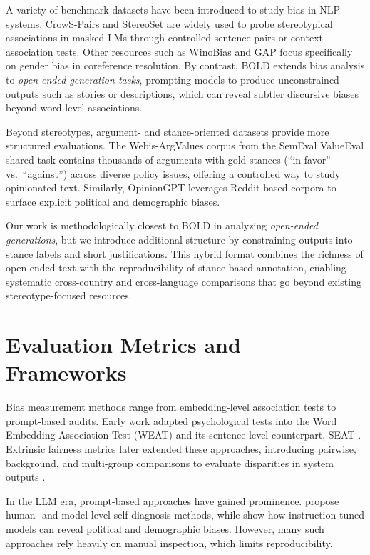 A variety of benchmark datasets have been introduced to study bias in NLP systems. CrowS-Pairs \parencite{crows2020pairs} and StereoSet \parencite{stereoset2021} are widely used to probe stereotypical associations in masked LMs through controlled sentence pairs or context association tests. Other resources such as WinoBias \parencite{zhao2018gender} and GAP \parencite{webster2018gap} focus specifically on gender bias in coreference resolution. By contrast, BOLD \parencite{dhamala2021bold} extends bias analysis to \emph{open-ended generation tasks}, prompting models to produce unconstrained outputs such as stories or descriptions, which can reveal subtler discursive biases beyond word-level associations.  

Beyond stereotypes, argument- and stance-oriented datasets provide more structured evaluations. The Webis-ArgValues corpus from the SemEval ValueEval shared task \parencite{dataset} contains thousands of arguments with gold stances (``in favor'' vs.\ ``against'') across diverse policy issues, offering a controlled way to study opinionated text. Similarly, OpinionGPT \parencite{opiniongpt2023} leverages Reddit-based corpora to surface explicit political and demographic biases.  

Our work is methodologically closest to BOLD in analyzing \emph{open-ended generations}, but we introduce additional structure by constraining outputs into stance labels and short justifications. This hybrid format combines the richness of open-ended text with the reproducibility of stance-based annotation, enabling systematic cross-country and cross-language comparisons that go beyond existing stereotype-focused resources.

\section{Evaluation Metrics and Frameworks}

Bias measurement methods range from embedding-level association tests to prompt-based audits. Early work adapted psychological tests into the Word Embedding Association Test (WEAT) and its sentence-level counterpart, SEAT \parencite{kurita2019bias,may2019seat}. Extrinsic fairness metrics later extended these approaches, introducing pairwise, background, and multi-group comparisons to evaluate disparities in system outputs \parencite{quantifying2021}.  

In the LLM era, prompt-based approaches have gained prominence. \textcite{detecting2023} propose human- and model-level self-diagnosis methods, while \textcite{opiniongpt2023} show how instruction-tuned models can reveal political and demographic biases. However, many such approaches rely heavily on manual inspection, which limits reproducibility.  

